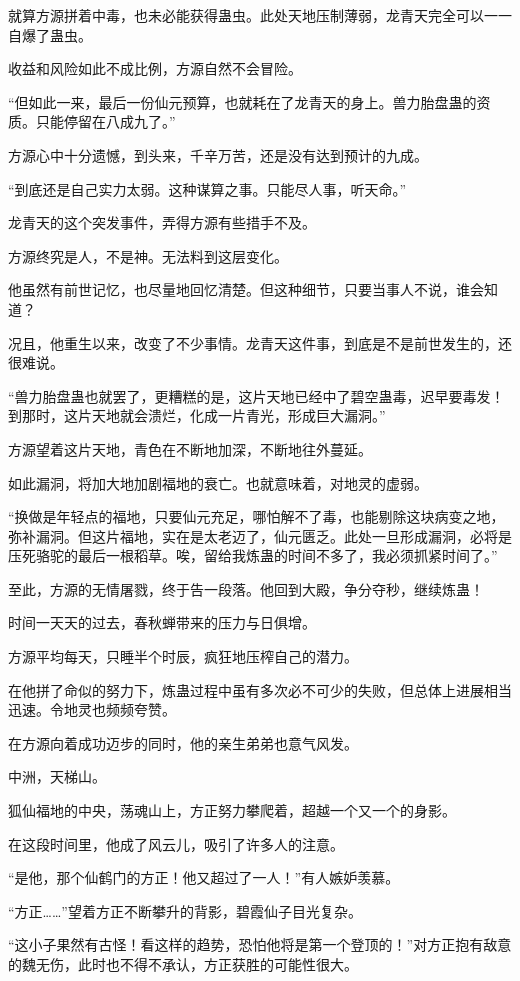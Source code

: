 \begin{this_body}
就算方源拼着中毒，也未必能获得蛊虫。此处天地压制薄弱，龙青天完全可以一一自爆了蛊虫。

收益和风险如此不成比例，方源自然不会冒险。

“但如此一来，最后一份仙元预算，也就耗在了龙青天的身上。兽力胎盘蛊的资质。只能停留在八成九了。”

方源心中十分遗憾，到头来，千辛万苦，还是没有达到预计的九成。

“到底还是自己实力太弱。这种谋算之事。只能尽人事，听天命。”

龙青天的这个突发事件，弄得方源有些措手不及。

方源终究是人，不是神。无法料到这层变化。

他虽然有前世记忆，也尽量地回忆清楚。但这种细节，只要当事人不说，谁会知道？

况且，他重生以来，改变了不少事情。龙青天这件事，到底是不是前世发生的，还很难说。

“兽力胎盘蛊也就罢了，更糟糕的是，这片天地已经中了碧空蛊毒，迟早要毒发！到那时，这片天地就会溃烂，化成一片青光，形成巨大漏洞。”

方源望着这片天地，青色在不断地加深，不断地往外蔓延。

如此漏洞，将加大地加剧福地的衰亡。也就意味着，对地灵的虚弱。

“换做是年轻点的福地，只要仙元充足，哪怕解不了毒，也能剔除这块病变之地，弥补漏洞。但这片福地，实在是太老迈了，仙元匮乏。此处一旦形成漏洞，必将是压死骆驼的最后一根稻草。唉，留给我炼蛊的时间不多了，我必须抓紧时间了。”

至此，方源的无情屠戮，终于告一段落。他回到大殿，争分夺秒，继续炼蛊！

时间一天天的过去，春秋蝉带来的压力与日俱增。

方源平均每天，只睡半个时辰，疯狂地压榨自己的潜力。

在他拼了命似的努力下，炼蛊过程中虽有多次必不可少的失败，但总体上进展相当迅速。令地灵也频频夸赞。

在方源向着成功迈步的同时，他的亲生弟弟也意气风发。

中洲，天梯山。

狐仙福地的中央，荡魂山上，方正努力攀爬着，超越一个又一个的身影。

在这段时间里，他成了风云儿，吸引了许多人的注意。

“是他，那个仙鹤门的方正！他又超过了一人！”有人嫉妒羡慕。

“方正……”望着方正不断攀升的背影，碧霞仙子目光复杂。

“这小子果然有古怪！看这样的趋势，恐怕他将是第一个登顶的！”对方正抱有敌意的魏无伤，此时也不得不承认，方正获胜的可能性很大。


\end{this_body}
